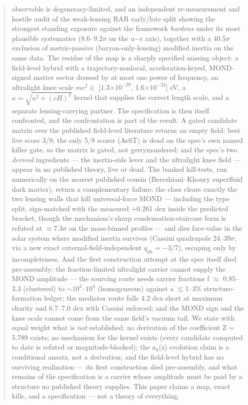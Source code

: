 \documentclass[11pt,a4paper]{article}
\begin{document}
\begin{abstract}
observable is degeneracy-limited, and an independent re-measurement and hostile audit of the weak-lensing RAR early/late split showing the strongest standing exposure against the framework \emph{hardens} under its most plausible systematics ($8.6$--$9.2\sigma$ on the u$-$r axis), together with a $40.5\sigma$ exclusion of metric-passive (baryon-only-lensing) modified inertia on the same data. The residue of the map is a sharply specified missing object: a field-level hybrid with a trajectory-nonlocal, acceleration-keyed, MOND-signed matter sector dressed by at most one power of frequency, an ultralight knee scale $mc^2 \in$ [1.3$\times10^{-29}$, 1.6$\times10^{-24}$] eV, a $\kappa = \sqrt{a^2+(cH)^2}$ kernel that supplies the correct length scale, and a separate lensing-carrying partner. The specification is then itself confronted, and the confrontation is part of the result. A gated candidate matrix over the published field-level literature returns an empty field: best live score 3/8; the only 5/8 scorer (AeST) is dead on the spec's own named killer gate, so the matrix is gated, not gerrymandered; and the spec's two \emph{derived} ingredients --- the inertia-side lever and the ultralight knee field --- appear in no published theory, live or dead. The banked kill-tests, run numerically on the nearest published cousin (Berezhiani--Khoury superfluid dark matter), return a complementary failure: the class clears exactly the two lensing walls that kill universal-force MOND --- including the type split, sign-matched with the measured +0.261 dex inside the predicted bracket, though the mechanism's sharp condensation-staircase form is refuted at $\approx{}7.3\sigma$ on the mass-binned profiles --- and dies face-value in the solar system where modified inertia survives (Cassini quadrupole $24$--$39\sigma$, via a new exact external-field-independent $q_{\mathrm{ph}} = -3/7$), escaping only by incompleteness. And the first construction attempt at the spec itself died pre-assembly: the fraction-limited ultralight carrier cannot supply the MOND amplitude --- the sourcing route needs carrier fractions f $\approx$ 0.85--3.3 (clustered) to $\sim{}10^{2}$--$10^{4}$ (homogeneous) against a $\lesssim$1--3\% structure-formation ledger; the mediator route falls 4.2 dex short at maximum charity and 6.7--7.0 dex with Cassini enforced; and the MOND sign and the knee scale cannot come from the same field's vacuum tail. We state with equal weight what is \emph{not} established: no derivation of the coefficient Z = 5.789 exists; no mechanism for the kernel exists (every candidate computed to date is refuted or magnitude-blocked); the $a_{0}$(z) evolution claim is a conditional ansatz, not a derivation; and the field-level hybrid has no surviving realization --- its first construction died pre-assembly, and what remains of the specification is a carrier whose amplitude must be paid by a structure no published theory supplies. This paper claims a map, exact kills, and a specification --- not a theory of everything.


\end{abstract}
\end{document}
